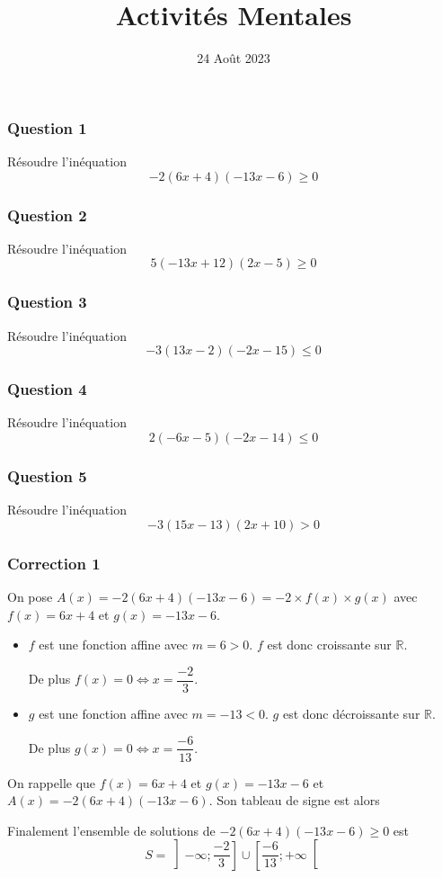\documentclass[15pt, mathserif]{beamer}
\title{Activités Mentales}
\date{24 Août 2023}
\begin{document}
\begin{frame}
    \titlepage
\end{frame}

\begin{frame} 
	\frametitle{Question 1}
Résoudre l'inéquation \[-2(6x+4)(-13x-6)\geq0\]\end{frame}


\begin{frame} 
	\frametitle{Question 2}
Résoudre l'inéquation \[5(-13x+12)(2x-5)\geq0\]\end{frame}


\begin{frame} 
	\frametitle{Question 3}
Résoudre l'inéquation \[-3(13x-2)(-2x-15)\leq0\]\end{frame}


\begin{frame} 
	\frametitle{Question 4}
Résoudre l'inéquation \[2(-6x-5)(-2x-14)\leq0\]\end{frame}


\begin{frame} 
	\frametitle{Question 5}
Résoudre l'inéquation \[-3(15x-13)(2x+10)>0\]\end{frame}


\begin{frame}
\vspace{-10mm}
	\frametitle{Correction 1}
On pose $A(x) = -2(6x+4)(-13x-6) = -2\times f(x) \times g(x)$ avec $f(x) = 6x+4$ et $g(x) = -13x-6$.

\begin{itemize}
	\item $f$ est une fonction affine avec $m =6>0$. $f$ est donc croissante sur $\mathbb{R}$.

	 De plus $f(x) = 0 \Leftrightarrow x = \dfrac{-2}{3}$.
	\item $g$ est une fonction affine avec $m =-13<0$. $g$ est donc décroissante sur $\mathbb{R}$.

	 De plus $g(x) = 0 \Leftrightarrow x = \dfrac{-6}{13}$.
\end{itemize}

 \end{frame}


\begin{frame}On rappelle que $f(x) = 6x+4$ et $g(x) = -13x-6$ et $A(x) = -2(6x+4)(-13x-6)$. Son tableau de signe est alors 

\medskip \hfil
{}

 Finalement l'ensemble de solutions de $-2(6x+4)(-13x-6)\geq0$ est\[S = \left]-\infty;\dfrac{-2}{3}\right]\cup\left[\dfrac{-6}{13};+\infty\right[\]

\end{frame}
\end{document}
